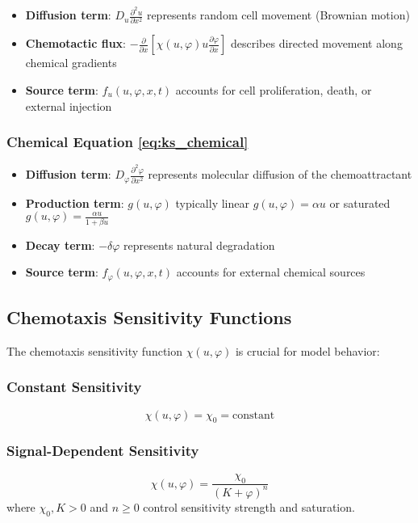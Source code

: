 \documentclass[11pt,a4paper]{article}
\begin{document}
\begin{itemize}
    \item \textbf{Diffusion term}: $D_u \frac{\partial^2 u}{\partial x^2}$ represents random cell movement (Brownian motion)
    \item \textbf{Chemotactic flux}: $-\frac{\partial}{\partial x}\left[\chi(u,\varphi) u \frac{\partial \varphi}{\partial x}\right]$ describes directed movement along chemical gradients
    \item \textbf{Source term}: $f_u(u,\varphi,x,t)$ accounts for cell proliferation, death, or external injection
\end{itemize}

\subsubsection{Chemical Equation \eqref{eq:ks_chemical}}

\begin{itemize}
    \item \textbf{Diffusion term}: $D_\varphi \frac{\partial^2 \varphi}{\partial x^2}$ represents molecular diffusion of the chemoattractant
    \item \textbf{Production term}: $g(u,\varphi)$ typically linear $g(u,\varphi) = \alpha u$ or saturated $g(u,\varphi) = \frac{\alpha u}{1+\beta u}$
    \item \textbf{Decay term}: $-\delta\varphi$ represents natural degradation
    \item \textbf{Source term}: $f_\varphi(u,\varphi,x,t)$ accounts for external chemical sources
\end{itemize}

\subsection{Chemotaxis Sensitivity Functions}

The chemotaxis sensitivity function $\chi(u,\varphi)$ is crucial for model behavior:

\subsubsection{Constant Sensitivity}
\begin{equation}
\chi(u,\varphi) = \chi_0 = \text{constant}
\end{equation}

\subsubsection{Signal-Dependent Sensitivity}
\begin{equation}
\chi(u,\varphi) = \frac{\chi_0}{(K + \varphi)^n}
\end{equation}
where $\chi_0, K > 0$ and $n \geq 0$ control sensitivity strength and saturation.
\end{document}

